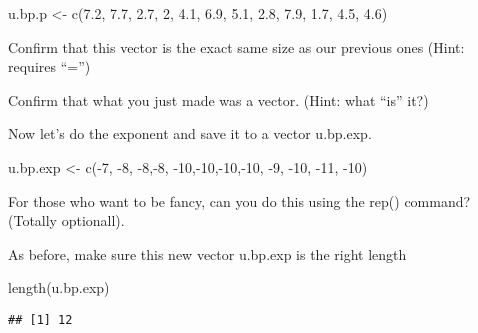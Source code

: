 \documentclass[
]{book}
\newenvironment{Shaded}{\begin{snugshade}}{\end{snugshade}}
\newcommand{\DecValTok}[1]{\textcolor[rgb]{0.00,0.00,0.81}{#1}}
\newcommand{\FloatTok}[1]{\textcolor[rgb]{0.00,0.00,0.81}{#1}}
\newcommand{\FunctionTok}[1]{\textcolor[rgb]{0.00,0.00,0.00}{#1}}
\newcommand{\NormalTok}[1]{#1}
\newcommand{\OtherTok}[1]{\textcolor[rgb]{0.56,0.35,0.01}{#1}}
\newcommand{\SpecialCharTok}[1]{\textcolor[rgb]{0.00,0.00,0.00}{#1}}
\begin{document}
\begin{Shaded}
\begin{Highlighting}[]
\NormalTok{u.bp.p }\OtherTok{\textless{}{-}} \FunctionTok{c}\NormalTok{(}\FloatTok{7.2}\NormalTok{, }\FloatTok{7.7}\NormalTok{, }\FloatTok{2.7}\NormalTok{, }\DecValTok{2}\NormalTok{, }\FloatTok{4.1}\NormalTok{, }\FloatTok{6.9}\NormalTok{, }\FloatTok{5.1}\NormalTok{, }\FloatTok{2.8}\NormalTok{, }\FloatTok{7.9}\NormalTok{, }\FloatTok{1.7}\NormalTok{, }\FloatTok{4.5}\NormalTok{, }\FloatTok{4.6}\NormalTok{)}
\end{Highlighting}
\end{Shaded}

Confirm that this vector is the exact same size as our previous ones (Hint: requires ``='')

Confirm that what you just made was a vector. (Hint: what ``is'' it?)

Now let's do the exponent and save it to a vector u.bp.exp.

\begin{Shaded}
\begin{Highlighting}[]
\NormalTok{u.bp.exp }\OtherTok{\textless{}{-}} \FunctionTok{c}\NormalTok{(}\SpecialCharTok{{-}}\DecValTok{7}\NormalTok{, }
            \SpecialCharTok{{-}}\DecValTok{8}\NormalTok{, }\SpecialCharTok{{-}}\DecValTok{8}\NormalTok{,}\SpecialCharTok{{-}}\DecValTok{8}\NormalTok{,}
            \SpecialCharTok{{-}}\DecValTok{10}\NormalTok{,}\SpecialCharTok{{-}}\DecValTok{10}\NormalTok{,}\SpecialCharTok{{-}}\DecValTok{10}\NormalTok{,}\SpecialCharTok{{-}}\DecValTok{10}\NormalTok{,}
            \SpecialCharTok{{-}}\DecValTok{9}\NormalTok{,}
            \SpecialCharTok{{-}}\DecValTok{10}\NormalTok{,}
            \SpecialCharTok{{-}}\DecValTok{11}\NormalTok{,}
            \SpecialCharTok{{-}}\DecValTok{10}\NormalTok{)}
\end{Highlighting}
\end{Shaded}

For those who want to be fancy, can you do this using the rep() command? (Totally optionall).

As before, make sure this new vector u.bp.exp is the right length

\begin{Shaded}
\begin{Highlighting}[]
\FunctionTok{length}\NormalTok{(u.bp.exp)}
\end{Highlighting}
\end{Shaded}

\begin{verbatim}
## [1] 12
\end{verbatim}
\end{document}
